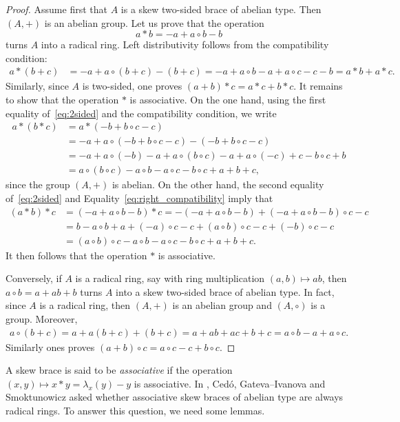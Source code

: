 \begin{proof}
    Assume first that $A$ is a skew two-sided brace of abelian type. Then $(A,+)$ is an abelian group. 
    Let us prove that the operation
    \[
    a*b=-a+a\circ b-b
    \]
    turns $A$ into a radical ring. Left distributivity follows from the compatibility condition:
    \begin{align*}
    a*(b+c)&=-a+a\circ (b+c)-(b+c)
    =-a+a\circ b-a+a\circ c-c-b=a*b+a*c.
    \end{align*}
    Similarly, since $A$ is two-sided, one proves $(a+b)*c=a*c+b*c$. It remains to show that the operation $*$
    is associative. On the one hand, using the first equality of~\eqref{eq:2sided} 
    and the compatibility condition, we write
    \begin{align*}
    a*(b*c)&=a*(-b+b\circ c-c)\\
    &=-a+a\circ(-b+b\circ c-c)-(-b+b\circ c-c)\\
    &=-a+a\circ (-b)-a+a\circ(b\circ c)-a+a\circ (-c)+c-b\circ c+b\\
    &=a\circ (b\circ c)-a\circ b-a\circ c-b\circ c+a+b+c,
    \end{align*}
    since the group $(A,+)$ is abelian. On the other hand, the second equality of~\eqref{eq:2sided} and
    Equality~\eqref{eq:right_compatibility} imply that
    \begin{align*}
    (a*b)*c &= (-a+a\circ b-b)*c=-(-a+a\circ b-b)+(-a+a\circ b-b)\circ c-c\\
    &=b-a\circ b+a+(-a)\circ c-c+(a\circ b)\circ c-c+(-b)\circ c-c\\
    &=(a\circ b)\circ c-a\circ b-a\circ c-b\circ c+a+b+c.
    \end{align*}
    It then follows that the operation $*$ is associative. 
    
    Conversely, if $A$ is a radical ring, say with ring multiplication $(a,b)\mapsto ab$, 
    then $a\circ b=a+ab+b$ turns $A$ into a skew two-sided brace 
    of abelian type. In fact, since $A$ is a radical ring, then 
    $(A,+)$ is an abelian group and $(A,\circ)$ is a group. Moreover, 
    \begin{align*}
        a\circ (b+c)=a+a(b+c)+(b+c)=a+ab+ac+b+c=a\circ b-a+a\circ c.
    \end{align*}
    Similarly ones proves $(a+b)\circ c=a\circ c-c+b\circ c$.
\end{proof}

A skew brace is said to be \emph{associative} if the operation $(x,y)\mapsto
x*y=\lambda_x(y)-y$ is associative. In \cite[Question 2.1(2)]{MR3818285}, 
Cedó, Gateva--Ivanova and Smoktunowicz asked whether associative skew braces of abelian type are always radical rings. 
To answer this question, we need some lemmas. 

